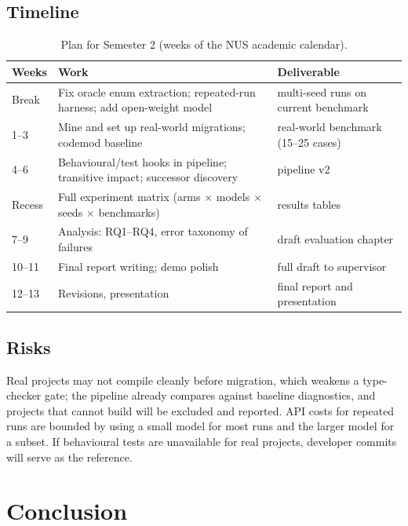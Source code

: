 \documentclass[11pt,a4paper]{article}
\begin{document}
\subsection{Timeline}

\begin{table}[h]
\centering
\small
\caption{Plan for Semester 2 (weeks of the NUS academic calendar).}
\label{tab:timeline}
\begin{tabularx}{\textwidth}{@{}l L l@{}}
\toprule
Weeks & Work & Deliverable\\
\midrule
Break       & Fix oracle enum extraction; repeated-run harness; add open-weight model & multi-seed runs on current benchmark\\
1--3        & Mine and set up real-world migrations; codemod baseline & real-world benchmark (15--25 cases)\\
4--6        & Behavioural/test hooks in pipeline; transitive impact; successor discovery & pipeline v2\\
Recess      & Full experiment matrix (arms $\times$ models $\times$ seeds $\times$ benchmarks) & results tables\\
7--9        & Analysis: RQ1--RQ4, error taxonomy of failures & draft evaluation chapter\\
10--11      & Final report writing; demo polish & full draft to supervisor\\
12--13      & Revisions, presentation & final report and presentation\\
\bottomrule
\end{tabularx}
\end{table}

\subsection{Risks}

Real projects may not compile cleanly before migration, which weakens a type-checker gate;
the pipeline already compares against baseline diagnostics, and projects that cannot build
will be excluded and reported. API costs for repeated runs are bounded by using a small model
for most runs and the larger model for a subset. If behavioural tests are unavailable for real
projects, developer commits will serve as the reference.

\section{Conclusion}
\end{document}
